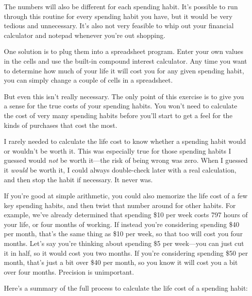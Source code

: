 The numbers will also be different for each spending habit. It's possible to run through this routine for every spending habit you have, but it would be very tedious and unnecessary. It's also not very feasible to whip out your financial calculator and notepad whenever you're out shopping.

One solution is to plug them into a spreadsheet program. Enter your own values in the cells and use the built-in compound interest calculator. Any time you want to determine how much of your life it will cost you for any given spending habit, you can simply change a couple of cells in a spreadsheet.

But even this isn't really necessary. The only point of this exercise is to give you a sense for the true costs of your spending habits. You won't need to calculate the cost of very many spending habits before you'll start to get a feel for the kinds of purchases that cost the most.

I rarely needed to calculate the life cost to know whether a spending habit would or wouldn't be worth it. This was especially true for those spending habits I guessed would \emph{not} be worth it---the risk of being wrong was zero. When I guessed it \emph{would} be worth it, I could always double-check later with a real calculation, and then stop the habit if necessary. It never was.

If you're good at simple arithmetic, you could also memorize the life cost of a few key spending habits, and then twist that number around for other habits. For example, we've already determined that spending \$10 per week costs 797 hours of your life, or four months of working. If instead you're considering spending \$40 per month, that's the same thing as \$10 per week, so that too will cost you four months. Let's say you're thinking about spending \$5 per week---you can just cut it in half, so it would cost you two months. If you're considering spending \$50 per month, that's just a bit over \$40 per month, so you know it will cost you a bit over four months. Precision is unimportant.

Here's a summary of the full process to calculate the life cost of a spending habit:


